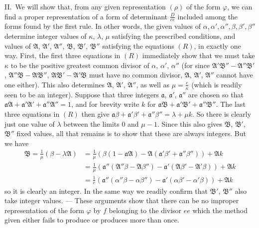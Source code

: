 II.\ We will show that, from any given representation $(\rho)$ of the
form $\varphi$, we can find a proper representation of a form of determinant
$\frac{D}{ee}$ included among the forms found by the first rule. In other words,
the given values of $\alpha,\allowbreak \alpha',\allowbreak \alpha'',\allowbreak \beta,\allowbreak \beta',\allowbreak \beta''$ determine integer values of $\kappa$, $\lambda$,
$\mu$ satisfying the prescribed conditions, and values of $\mathfrak{A}$,
$\mathfrak{A}'$, $\mathfrak{A}''$, $\mathfrak{B}$, $\mathfrak{B}'$, $\mathfrak{B}''$ satisfying the equations
$(R)$, in exactly one way. First, the first three equations in $(R)$
immediately show that we must take $\kappa$ to be the positive greatest
common divisor of $\alpha$, $\alpha'$, $\alpha''$ (for since $\mathfrak{A}'\mathfrak{B}''-\mathfrak{A}''\mathfrak{B}'$,
$\mathfrak{A}''\mathfrak{B}-\mathfrak{A}\mathfrak{B}''$, $\mathfrak{A}\mathfrak{B}'-\mathfrak{A}'\mathfrak{B}$ must have no common divisor, $\mathfrak{A}$, $\mathfrak{A}'$,
$\mathfrak{A}''$ cannot have one either). This also determines $\mathfrak{A}$, $\mathfrak{A}'$,
$\mathfrak{A}''$, as well as $\mu=\frac{e}{\kappa}$ (which is readily seen to be an integer).
Suppose that three integers $\mathfrak{a}$, $\mathfrak{a}'$, $\mathfrak{a}''$ are chosen so
that $\mathfrak{a}\mathfrak{A}+\mathfrak{a}'\mathfrak{A}'+\mathfrak{a}''\mathfrak{A}''=1$, and for brevity write $k$ for $\mathfrak{a}\mathfrak{B}+\mathfrak{a}'\mathfrak{B}'+\mathfrak{a}''\mathfrak{B}''$.
The last three equations in $(R)$ then give $\mathfrak{a}\beta+\mathfrak{a}'\beta'+\mathfrak{a}''\beta''=\lambda+\mu k$. So there is
clearly just one value of $\lambda$ between the limits $0$ and $\mu-1$.
Since this also gives $\mathfrak{B}$, $\mathfrak{B}'$, $\mathfrak{B}''$ fixed values, all that
remains is to show that these are always integers. But we have
\[
\begin{aligned}
\mathfrak{B}=\frac{1}{\mu}(\beta-\lambda\mathfrak{A})
&=\frac{1}{\mu}(\beta(1-\mathfrak{a}\mathfrak{A})-\mathfrak{A}(\mathfrak{a}'\beta'+\mathfrak{a}''\beta''))+\mathfrak{A}k\\
&=\frac{1}{\mu}(\mathfrak{a}''(\mathfrak{A}''\beta-\mathfrak{A}\beta'')-\mathfrak{a}'(\mathfrak{A}\beta'-\mathfrak{A}'\beta))+\mathfrak{A}k\\
&=\frac{1}{e}(\mathfrak{a}''(\alpha''\beta-\alpha\beta'')-\mathfrak{a}'(\alpha\beta'-\alpha'\beta))+\mathfrak{A}k
\end{aligned}
\]
so it is clearly an integer. In the same way we readily confirm that
$\mathfrak{B}'$, $\mathfrak{B}''$ also take integer values. --- These arguments show
that there can be no improper representation of the form $\varphi$ by
$f$ belonging to the divisor $ee$ which the method given either
fails to produce or produces more than once.

